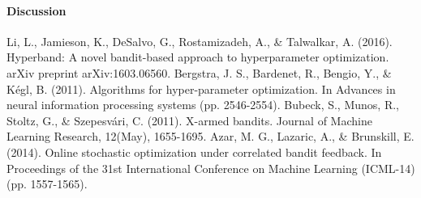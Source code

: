 \documentclass[runningheads,a4paper]{llncs}
\begin{document}
\paragraph{\textbf{Discussion}}

\begin{thebibliography}{4}

 Li, L., Jamieson, K., DeSalvo, G., Rostamizadeh, A., \& Talwalkar, A. (2016). Hyperband: A novel bandit-based approach to hyperparameter optimization. arXiv preprint arXiv:1603.06560.
 Bergstra, J. S., Bardenet, R., Bengio, Y., \& Kégl, B. (2011). Algorithms for hyper-parameter optimization. In Advances in neural information processing systems (pp. 2546-2554).
 Bubeck, S., Munos, R., Stoltz, G., \& Szepesvári, C. (2011). X-armed bandits. Journal of Machine Learning Research, 12(May), 1655-1695.
 Azar, M. G., Lazaric, A., \& Brunskill, E. (2014). Online stochastic optimization under correlated bandit feedback. In Proceedings of the 31st International Conference on Machine Learning (ICML-14) (pp. 1557-1565).

\end{thebibliography}


\end{document}
